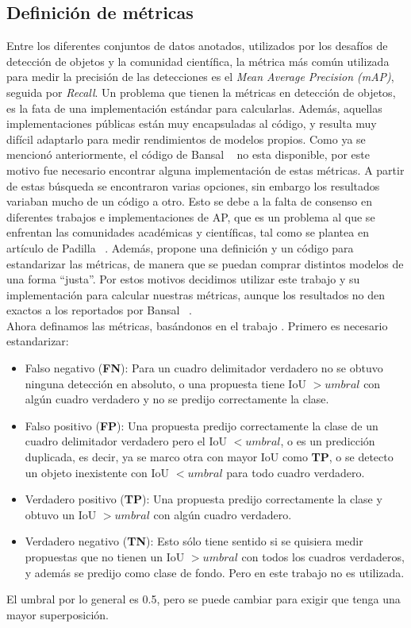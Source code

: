 \subsection{Definición de métricas} \label{ssec:definiciondemetricas}
Entre los diferentes conjuntos de datos anotados, utilizados por los desafíos de detección de objetos y la comunidad científica, la métrica más común utilizada para medir la precisión de las detecciones es el  \textit{Mean Average Precision (mAP)}, seguida por \textit{Recall}. Un problema que tienen la métricas en detección de objetos, es la fata de una implementación estándar para calcularlas. Además, aquellas implementaciones públicas están muy encapsuladas al código, y resulta muy difícil adaptarlo para medir rendimientos de modelos propios. Como ya se mencionó anteriormente, el código de Bansal \etal~\cite{bansal2018zero} no esta disponible, por este motivo fue necesario encontrar alguna implementación de estas métricas. A partir de estas búsqueda se encontraron varias opciones, sin embargo los resultados variaban mucho de un código a otro. Esto se debe a la falta de consenso en diferentes trabajos e implementaciones de AP, que es un problema al que se enfrentan las comunidades académicas y científicas, tal como se plantea en artículo de Padilla \etal~\cite{padilla2020survey}. Además, propone una definición y un código para estandarizar las métricas, de manera que se puedan comprar distintos modelos de una forma ``justa''. Por estos motivos decidimos utilizar este trabajo y su implementación para calcular nuestras métricas, aunque los resultados no den exactos a los reportados por Bansal \etal~\cite{bansal2018zero}.\\

Ahora definamos las métricas, basándonos en el trabajo \cite{padilla2020survey}. Primero es necesario estandarizar:
\begin{itemize}
	\item Falso negativo (\textbf{FN}): Para un cuadro delimitador verdadero no se obtuvo ninguna detección en absoluto, o una propuesta tiene IoU $> umbral$ con algún cuadro verdadero y no se predijo correctamente la clase.
	\item Falso positivo (\textbf{FP}): Una propuesta predijo correctamente la clase de un cuadro delimitador verdadero pero el IoU $< umbral$, o es un predicción duplicada, es decir, ya se marco otra con mayor IoU como \textbf{TP}, o se detecto un objeto inexistente con IoU $< umbral$ para todo cuadro verdadero.
	\item Verdadero positivo (\textbf{TP}): Una propuesta predijo correctamente la clase y obtuvo un IoU $> umbral$ con algún cuadro verdadero.
	\item Verdadero negativo (\textbf{TN}): Esto sólo tiene sentido si se quisiera medir propuestas que no tienen un IoU $> umbral$ con todos los cuadros verdaderos, y además se predijo como clase de fondo. Pero en este trabajo no es utilizada.
\end{itemize}
El umbral por lo general es 0.5, pero se puede cambiar para exigir que tenga una mayor superposición.\\

